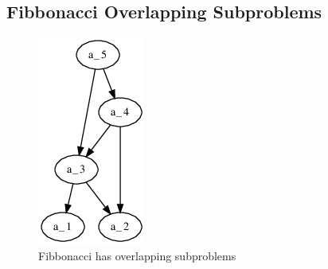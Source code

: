 \documentclass[12pt]{article}
\theoremstyle{definition}
\begin{document}
\subsection{Fibbonacci Overlapping Subproblems}
\begin{figure}[H]
\caption{Fibbonacci has overlapping subproblems}
\centering
\includegraphics[width=.3\textwidth]{./Images/fibb.png}
\end{figure}
\end{document}
